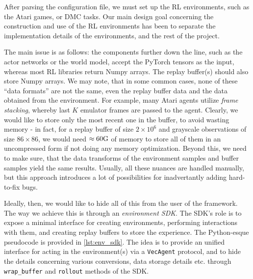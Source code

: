 \documentclass[en]{pracamgr}
\begin{document}
After parsing the configuration file, we must set up the RL environments, such as the Atari games, or DMC tasks. Our main design goal concerning the construction and use of the RL environments has been to separate the implementation details of the environments, and the rest of the project.

The main issue is as follows: the components further down the line, such as the actor networks or the world model, accept the PyTorch tensors as the input, whereas most RL libraries return Numpy arrays. The replay buffer(s) should also store Numpy arrays. We may note, that in some common cases, none of these ``data formats'' are not the same, even the replay buffer data and the data obtained from the environment. For example, many Atari agents utilize \emph{frame stacking}, whereby last $K$ emulator frames are passed to the agent. Clearly, we would like to store only the most recent one in the buffer, to avoid wasting memory - in fact, for a replay buffer of size $2 \times 10^6$ and grayscale observations of size $86 \times 86$, we would need $\approx 60{\rm G}$ of memory to store all of them in an uncompressed form if not doing any memory optimization. Beyond this, we need to make sure, that the data transforms of the environment samples and buffer samples yield the same results. Usually, all these nuances are handled manually, but this approach introduces a lot of possibilities for inadvertantly adding hard-to-fix bugs.

Ideally, then, we would like to hide all of this from the user of the framework. The way we achieve this is through an \emph{environment SDK}. The SDK's role is to expose a minimal interface for creating environments, performing interactions with them, and creating replay buffers to store the experience. The Python-esque pseudocode is provided in \autoref{lst:env_sdk}. The idea is to provide an unified interface for acting in the environment(s) via a {\tt VecAgent} protocol, and to hide the details concerning various conversions, data storage details etc. through {\tt wrap\_buffer} and {\tt rollout} methods of the SDK.
\end{document}
